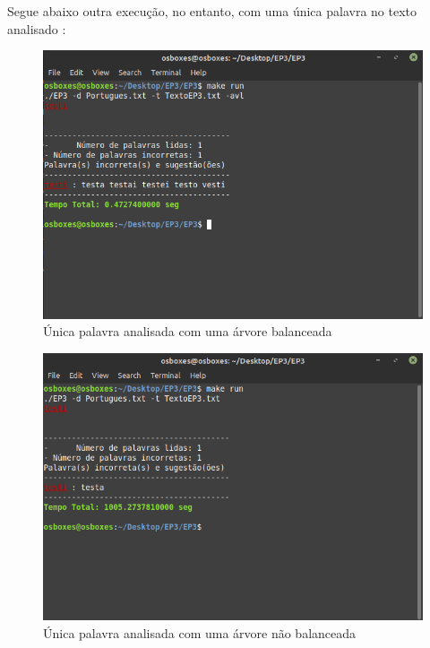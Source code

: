\documentclass[12pt]{article}
\begin{document}
	Segue abaixo outra execução, no entanto, com uma única palavra no texto analisado :
	
	\begin{center}
		\begin{figure}[!h]
			\includegraphics[scale = 0.9]{teste3.png}
			\caption{Única palavra analisada com uma árvore balanceada}
		\end{figure}
	\end{center}
	
	\begin{center}
		\begin{figure}[!h]
			\includegraphics[scale = 0.9]{teste4.png}
			\caption{Única palavra analisada com uma árvore não balanceada}
		\end{figure}
	\end{center}
\end{document}
